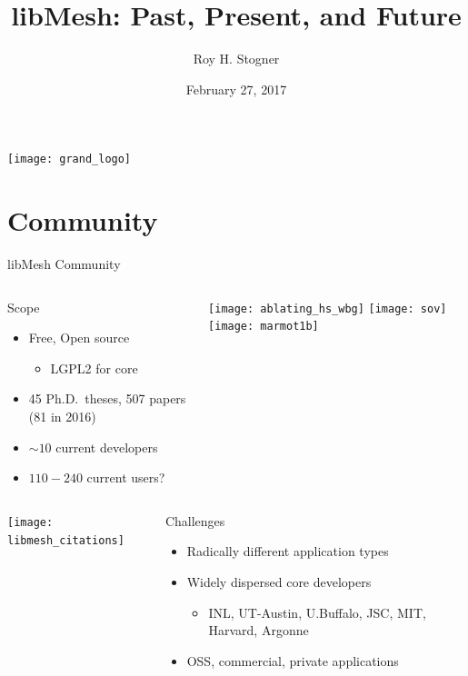 \documentclass[mathserif]{beamer}
\date{February 27, 2017}
\author[R. Stogner]{Roy H. Stogner}
\institute{The University of Texas at Austin}
\title[libMesh]{libMesh: Past, Present, and Future}
\begin{document}
\begin{frame}
\begin{center}
\texttt{[image: grand\_logo]}\\
\end{center}
\titlepage
\begin{flushright}
\end{flushright}
\end{frame}


\section{Community}


\begin{frame}{libMesh Community}
\begin{columns}
\begin{block}{Scope}
\begin{itemize}
\item Free, Open source
\begin{itemize}
\item LGPL2 for core
\end{itemize}
\item 45 Ph.D.\ theses, 507 papers (81 in 2016)
\item $\sim10$ current developers
\item $110-240$ current users?
\end{itemize}
\end{block}

\texttt{[image: ablating\_hs\_wbg]}
\texttt{[image: sov]}
\texttt{[image: marmot1b]}
\end{columns}

\begin{columns}
\texttt{[image: libmesh\_citations]}

\begin{block}{Challenges}
\begin{itemize}
\item Radically different application types
\item Widely dispersed core developers
\begin{itemize}
\item INL, UT-Austin, U.Buffalo, JSC, MIT, Harvard, Argonne
\end{itemize}
\item OSS, commercial, private applications
\end{itemize}
\end{block}
\end{columns}

\end{frame}
\end{document}

